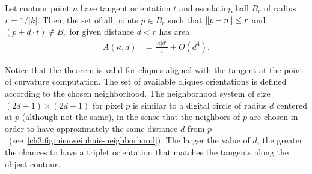 \begin{theorem}{\cite{nieuwenhuis14efficient}}\label{ch3:thm:nieuweinhuis}
Let contour point $n$ have tangent orientation $t$ and osculating ball $B_r$ of radius $r=1/|k|$. Then, the set of all points $p \in B_r$ such that $\lVert p-n\rVert \leq r$ and $(p \pm d \cdot t) \notin B_r$ for given distance $d < r$ has area 
\begin{align*}
	A(\kappa,d) &= \frac{|\kappa|d^3}{4} + O(d^4).
\end{align*}
%
\end{theorem}

Notice that the theorem is valid for cliques aligned with the tangent at the point of curvature computation. The set of available cliques orientations is defined according to the chosen neighborhood. The neighborhood system of size $(2d+1) \times (2d+1)$ for pixel $p$ is similar to a digital circle of radius $d$ centered at $p$ (although not the same), in the sense that the neighbors of $p$ are chosen in order to have approximately the same distance $d$ from $p$~(see~\cref{ch3:fig:nieuweinhuis-neighborhood}). The larger the value of $d$, the greater the chances to have a triplet orientation that matches the tangents along the object contour.

